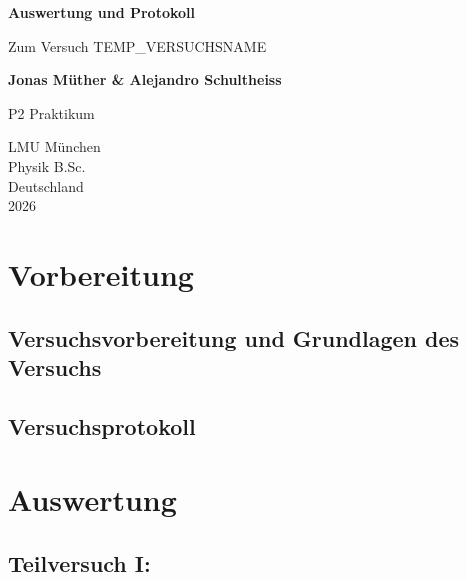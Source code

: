\documentclass{report}
\begin{document}

\begin{titlepage}
    \begin{center}
        \vspace*{1cm}
            
        \Huge
        \textbf{Auswertung und Protokoll}
            
        \vspace{0.5cm}
        \LARGE
        Zum Versuch TEMP_VERSUCHSNAME
        
        \vspace{1.8cm}

        \textbf{Jonas Müther \& Alejandro Schultheiss}
        \vfill
            
        P2 Praktikum\\
       
            
        \vspace{0.8cm}
  

        \vspace{1.8cm}
        \Large
        LMU München \\
        Physik B.Sc.\\
        Deutschland\\
        2026
            
    \end{center}
\end{titlepage}
\tableofcontents

\newpage
\chapter{Vorbereitung}

\section{Versuchsvorbereitung und Grundlagen des Versuchs}


\section{Versuchsprotokoll}


\newpage
\chapter{Auswertung}
\section{Teilversuch I:}
\end{document}
